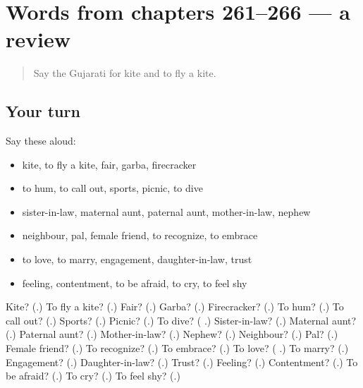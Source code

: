 \section[(dialogue)]{Words from chapters 261–266 — a review}

\label{lesson:GU-R266-review-261-266}



\begin{quote}
Say the Gujarati for kite and to fly a kite.
\end{quote}

\subsection*{Your turn}
Say these aloud:

\begin{itemize}
\raggedright
  \item kite, to fly a kite, fair, garba, firecracker
  \item to hum, to call out, sports, picnic, to dive
  \item sister-in-law, maternal aunt, paternal aunt, mother-in-law, nephew
  \item neighbour, pal, female friend, to recognize, to embrace
  \item to love, to marry, engagement, daughter-in-law, trust
  \item feeling, contentment, to be afraid, to cry, to feel shy
\end{itemize}

\begin{tcolorbox}[breakable,colback=teal!4,colframe=teal!35!black,title={Before you move on}]
Kite? (\textbf{}.) To fly a kite? (\textbf{}.) Fair? (\textbf{}.) Garba? (\textbf{}.) Firecracker? (\textbf{}.) To hum? (\textbf{}.) To call out? (\textbf{}.) Sports? (\textbf{}.) Picnic? (\textbf{}.) To dive? (\textbf{ }.) Sister-in-law? (\textbf{}.) Maternal aunt? (\textbf{}.) Paternal aunt? (\textbf{}.) Mother-in-law? (\textbf{}.) Nephew? (\textbf{}.) Neighbour? (\textbf{}.) Pal? (\textbf{}.) Female friend? (\textbf{}.) To recognize? (\textbf{}.) To embrace? (\textbf{}.) To love? (\textbf{ }.) To marry? (\textbf{}.) Engagement? (\textbf{}.) Daughter-in-law? (\textbf{}.) Trust? (\textbf{}.) Feeling? (\textbf{}.) Contentment? (\textbf{}.) To be afraid? (\textbf{}.) To cry? (\textbf{}.) To feel shy? (\textbf{}.)
\end{tcolorbox}
